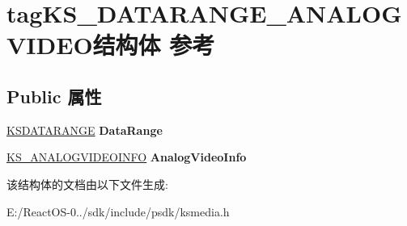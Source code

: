 \hypertarget{structtag_k_s___d_a_t_a_r_a_n_g_e___a_n_a_l_o_g_v_i_d_e_o}{}\section{tag\+K\+S\+\_\+\+D\+A\+T\+A\+R\+A\+N\+G\+E\+\_\+\+A\+N\+A\+L\+O\+G\+V\+I\+D\+E\+O结构体 参考}
\label{structtag_k_s___d_a_t_a_r_a_n_g_e___a_n_a_l_o_g_v_i_d_e_o}
\subsection*{Public 属性}
\begin{DoxyCompactItemize}
\item 
\mbox{\label{structtag_k_s___d_a_t_a_r_a_n_g_e___a_n_a_l_o_g_v_i_d_e_o_ac4af119aa2fbf1fd1065f5b5fd92e190}} 
\hyperlink{struct_k_s_d_a_t_a_f_o_r_m_a_t}{K\+S\+D\+A\+T\+A\+R\+A\+N\+GE} {\bfseries Data\+Range}
\item 
\mbox{\label{structtag_k_s___d_a_t_a_r_a_n_g_e___a_n_a_l_o_g_v_i_d_e_o_ad8ee15a679e32f1d22d279c20b5b32e8}} 
\hyperlink{structtag_k_s___analog_video_info}{K\+S\+\_\+\+A\+N\+A\+L\+O\+G\+V\+I\+D\+E\+O\+I\+N\+FO} {\bfseries Analog\+Video\+Info}
\end{DoxyCompactItemize}


该结构体的文档由以下文件生成\+:\begin{DoxyCompactItemize}
\item 
E\+:/\+React\+O\+S-\/0../sdk/include/psdk/ksmedia.\+h\end{DoxyCompactItemize}
